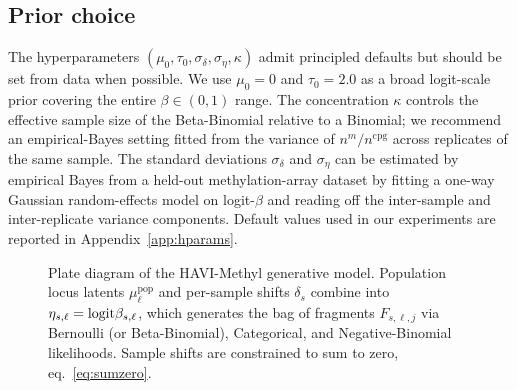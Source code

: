 \subsection{Prior choice}
The hyperparameters $(\mu_0,\tau_0,\sigma_\delta,\sigma_\eta,\kappa)$ admit principled defaults but should be set from data when possible. We use $\mu_0=0$ and $\tau_0=2.0$ as a broad logit-scale prior covering the entire $\beta\in(0,1)$ range. The concentration $\kappa$ controls the effective sample size of the Beta-Binomial relative to a Binomial; we recommend an empirical-Bayes setting fitted from the variance of $n^m/n^{\mathrm{cpg}}$ across replicates of the same sample. The standard deviations $\sigma_\delta$ and $\sigma_\eta$ can be estimated by empirical Bayes from a held-out methylation-array dataset by fitting a one-way Gaussian random-effects model on logit-$\beta$ and reading off the inter-sample and inter-replicate variance components. Default values used in our experiments are reported in Appendix~\ref{app:hparams}.

\begin{figure}[t]
\centering
{}
\caption{Plate diagram of the HAVI-Methyl generative model. Population locus latents $\mu^{\mathrm{pop}}_\ell$ and per-sample shifts $\delta_s$ combine into $\eta_{s,\ell}=\mathrm{logit}\beta_{s,\ell}$, which generates the bag of fragments $F_{s,\ell,j}$ via Bernoulli (or Beta-Binomial), Categorical, and Negative-Binomial likelihoods. Sample shifts are constrained to sum to zero, eq.~\eqref{eq:sumzero}.}
\end{figure}

